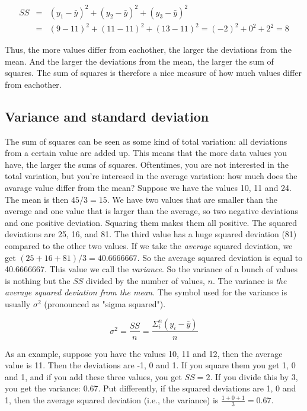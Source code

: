 \documentclass[]{report}\usepackage[]{graphicx}\usepackage[]{color}
\begin{document}
\begin{eqnarray}
SS &=& (y_1-\bar{y})^2 + (y_2-\bar{y})^2 +(y_3-\bar{y})^2 \\
&=& (9-11)^2 + (11-11)^2 +(13-11)^2= (-2)^2 + 0^2 + 2^2=8 \nonumber
\end{eqnarray}

Thus, the more values differ from eachother, the larger the deviations from the mean. And the larger the deviations from the mean, the larger the sum of squares. The sum of squares is therefore a nice measure of how much values differ from eachother.

\subsection{Variance and standard deviation}

The sum of squares can be seen as some kind of total variation: all deviations from a certain value are added up. This means that the more data values you have, the larger the sums of squares. Oftentimes, you are not interested in the total variation, but you're interesed in the average variation: how much does the avarage value differ from the mean? Suppose we have the values 10, 11 and 24. The mean is then $45/3=15$. We have two values that are smaller than the average and one value that is larger than the average, so two negative deviations and one positive deviation. Squaring them makes them all positive. The squared deviations are 25, 16, and 81. The third value has a huge squared deviation (81) compared to the other two values. If we take the \textit{average} squared deviation, we get $(25+16+81)/3= 40.6666667$. So the average squared deviation is equal to 40.6666667. This value we call the \textit{variance}. So the variance of a bunch of values is nothing but the $SS$ divided by the number of values, $n$. The variance is \textit{the average squared deviation from the mean}. The symbol used for the variance is usually $\sigma^2$ (pronounced as "sigma squared").

\begin{equation}
\sigma^2 = \frac{SS}{n}= \frac{\Sigma_i^n (y_i-\bar{y})}{n}
\end{equation}


As an example, suppose you have the values 10, 11 and 12, then the average value is 11. Then the deviations are -1, 0 and 1. If you square them you get 1, 0 and 1, and if you add these three values, you get $SS=2$. If you divide this by 3, you get the variance: 0.67. Put differently, if the squared deviations are 1, 0 and 1, then the average squared deviation (i.e., the variance) is $\frac{1+0+1}{3}=0.67$.
\end{document}
